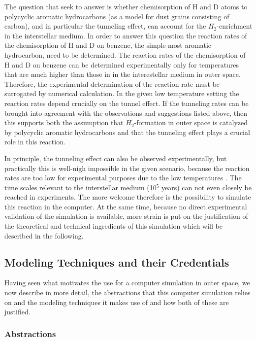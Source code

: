 \documentclass[12pt, a4paper]{article}
\numberwithin{equation}{section}
\begin{document}
The question that \citet{goumans-kaestner:2010} seek to answer is
whether chemisorption of H and D atoms to polycyclic aromatic
hydrocarbons (as a model for dust grains consisting of carbon), and in
particular the tunneling effect, can account for the $H_2$-enrichment
in the interstellar medium. In order to answer this question the
reaction rates of the chemisorption of H and D on benzene, the
simple-most aromatic hydrocarbon, need to be determined. The reaction
rates of the chemisorption of H and D on benzene can be determined
experimentally only for temperatures that are much higher than those
in in the interestellar medium in outer space. Therefore, the
experimental determination of the reaction rate must be surrogated by
numerical calculation. In the given low temperature setting the
reaction rates depend crucially on the tunnel effect. If the tunneling
rates can be brought into agreement with the observations and
suggestions listed above, then this supports both the assumption that
$H_2$-formation in outer space is catalyzed by polycyclic aromatic
hydrocarbons and that the tunneling effect plays a crucial role in
this reaction.

In principle, the tunneling effect can also be observed
experimentally, but practically this is well-nigh impossible in the
given scenario, because the reaction rates are too low for
experimental purposes due to the low temperatures
\citep[p. 7351]{goumans-kaestner:2010}. The time scales relevant to
the interstellar medium (10$^5$ years) can not even closely be reached
in experiments. The more welcome therefore is the possibility to
simulate this reaction in the computer. At the same time, because no
direct experimental validation of the simulation is available, more
strain is put on the justification of the theoretical and technical
ingredients of this simulation which will be described in the
following.


\subsection{Modeling Techniques and their Credentials}

Having seen what motivates the use for a computer simulation in outer
space, we now describe in more detail, the abstractions that this
computer simulation relies on and the modeling techniques it makes use
of and how both of these are justified.

\subsubsection{Abstractions} 
\end{document}
